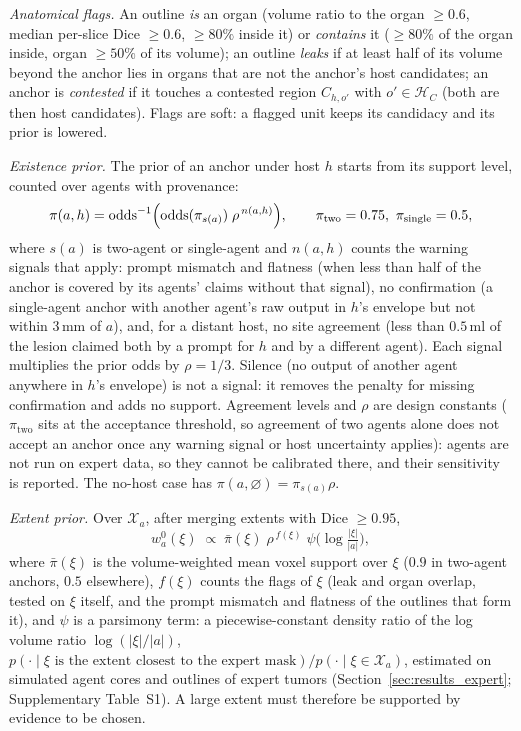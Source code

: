 \documentclass[fleqn,10pt]{olplainarticle}
\begin{document}
\emph{Anatomical flags.} An outline \emph{is} an organ (volume ratio to the organ $\ge0.6$, median per-slice Dice $\ge0.6$,
$\ge80\%$ inside it) or \emph{contains} it ($\ge80\%$ of the organ inside, organ $\ge50\%$ of its volume); an outline
\emph{leaks} if at least half of its volume beyond the anchor lies in organs that are not the anchor's host candidates;
an anchor is \emph{contested} if it touches a contested region $C_{h,o'}$ with $o'\in\mathcal{H}_C$ (both are then host
candidates). Flags are soft: a flagged unit keeps its candidacy and its prior is lowered.

\emph{Existence prior.} The prior of an anchor under host $h$ starts from its support level, counted over agents with
provenance:
\begin{equation}
\label{eq:existence_prior}
\pi(a,h)=\operatorname{odds}^{-1}\Bigl(\operatorname{odds}(\pi_{s(a)})\;\rho^{\,n(a,h)}\Bigr),\qquad
\pi_{\text{two}}=0.75,\ \pi_{\text{single}}=0.5,
\end{equation}
where $s(a)$ is two-agent or single-agent and $n(a,h)$ counts the warning signals that apply: prompt mismatch and flatness
(when less than half of the anchor is covered by its agents' claims without that signal),
no confirmation (a single-agent anchor with another agent's raw output in $h$'s envelope but not within $3$\,mm of $a$), and,
for a distant host, no site agreement (less than $0.5$\,ml of the lesion claimed both by a prompt for $h$ and by a different
agent). Each signal multiplies the prior odds by $\rho=1/3$. Silence (no output of another agent anywhere in $h$'s envelope)
is not a signal: it removes the penalty for missing confirmation and adds no support. Agreement levels and $\rho$ are
design constants ($\pi_{\text{two}}$ sits at the acceptance threshold, so agreement of two agents alone does not accept
an anchor once any warning signal or host uncertainty applies): agents are not run on expert data, so they cannot be calibrated there, and their sensitivity is
reported. The no-host case has $\pi(a,\varnothing)=\pi_{s(a)}\rho$.

\emph{Extent prior.} Over $\mathcal{X}_a$, after merging extents with Dice $\ge0.95$,
\begin{equation}
\label{eq:extent_prior}
w^0_a(\xi)\;\propto\;\bar\pi(\xi)\;\rho^{\,f(\xi)}\;\psi\bigl(\log\tfrac{|\xi|}{|a|}\bigr),
\end{equation}
where $\bar\pi(\xi)$ is the volume-weighted mean voxel support over $\xi$ ($0.9$ in two-agent anchors, $0.5$ elsewhere),
$f(\xi)$ counts the flags of $\xi$ (leak and organ overlap, tested on $\xi$ itself, and the prompt mismatch and flatness of the
outlines that form it), and $\psi$ is a parsimony term: a piecewise-constant density ratio of the log volume ratio
$\log(|\xi|/|a|)$, $p(\cdot\mid\xi\text{ is the extent closest to the expert mask})/p(\cdot\mid\xi\in\mathcal{X}_a)$, estimated on
simulated agent cores and outlines of expert tumors (Section~\ref{sec:results_expert}; Supplementary Table~S1). A large extent must therefore be supported by evidence to be
chosen.
\end{document}
